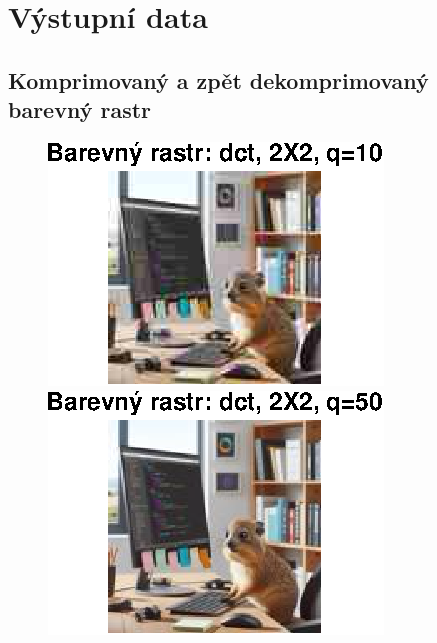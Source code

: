 \section{Výstupní data}

\subsection{Komprimovaný a zpět dekomprimovaný barevný rastr}
\begin{figure}[H]
    \centering
    \begin{minipage}[b]{0.3\textwidth}
        \centering
        \includegraphics[width=\textwidth]{images/barevny_dct_2X2_q10.eps}
    \end{minipage}
    \hfill
    \begin{minipage}[b]{0.3\textwidth}
        \centering
        \includegraphics[width=\textwidth]{images/barevny_dct_2X2_q50.eps}

\end{minipage}
\end{figure}
